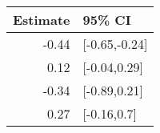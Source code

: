 \begin{tabular}{rl}
  \hline
Estimate & 95\% CI \\ 
  \hline
-0.44 & [-0.65,-0.24] \\ 
  0.12 & [-0.04,0.29] \\ 
  -0.34 & [-0.89,0.21] \\ 
  0.27 & [-0.16,0.7] \\ 
   \hline
\end{tabular}

